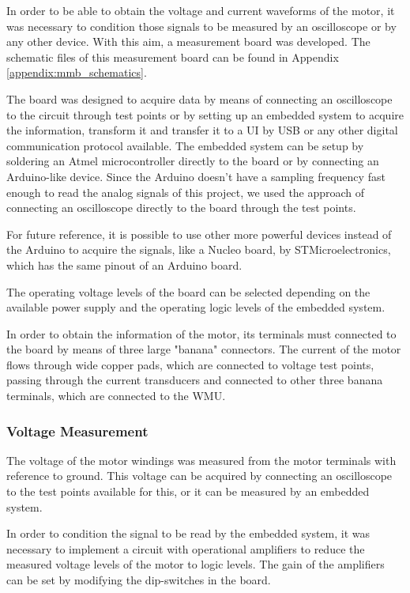 In order to be able to obtain the voltage and current waveforms of the motor, it was necessary to condition those signals to be measured by an oscilloscope or by any other device. With this aim, a measurement board was developed. The schematic files of this measurement board can be found in Appendix \ref{appendix:mmb_schematics}.

The board was designed to acquire data by means of connecting an oscilloscope to the circuit through test points or by setting up an embedded system to acquire the information, transform it and transfer it to a \ac{UI} by \ac{USB} or any other digital communication protocol available. The embedded system can be setup by soldering an Atmel microcontroller directly to the board or by connecting an Arduino-like device. Since the Arduino doesn't have a sampling frequency fast enough to read the analog signals of this project, we used the approach of connecting an oscilloscope directly to the board through the test points.

For future reference, it is possible to use other more powerful devices instead of the Arduino to acquire the signals, like a Nucleo board, by STMicroelectronics, which has the same pinout of an Arduino board.

The operating voltage levels of the board can be selected depending on the available power supply and the operating logic levels of the embedded system.

In order to obtain the information of the motor, its terminals must connected to the board by means of three large "banana" connectors. The current of the motor flows through wide copper pads, which are connected to voltage test points, passing through the current transducers and connected to other three banana terminals, which are connected to the \ac{WMU}.

\subsubsection{Voltage Measurement}

The voltage of the motor windings was measured from the motor terminals with reference to ground. This voltage can be acquired by connecting an oscilloscope to the test points available for this, or it can be measured by an embedded system.

In order to condition the signal to be read by the embedded system, it was necessary to implement a circuit with operational amplifiers to reduce the measured voltage levels of the motor to logic levels. The gain of the amplifiers can be set by modifying the dip-switches in the board.

